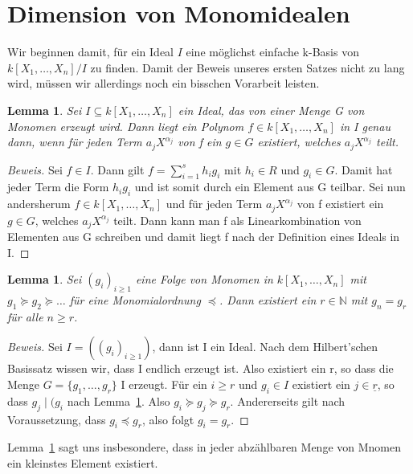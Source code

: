 \documentclass{article}
\newtheorem{lemma}[satz]{Lemma}
\newcommand*{\R}{k[X_{1},\ldots,X_{n}]}
\begin{document}
\section{Dimension von Monomidealen}
	
	Wir beginnen damit, für ein Ideal \(I\) eine möglichst einfache k-Basis von \(\R/I\) zu finden.
	Damit der Beweis unseres ersten Satzes nicht zu lang wird, müssen wir allerdings noch ein
	bisschen Vorarbeit leisten.

	\begin{lemma} \label{1.2.3}
	Sei \(I \subseteq \R\) ein Ideal, das von einer Menge G von Monomen erzeugt wird. Dann liegt
	ein Polynom \(f \in \R\) in I genau dann, wenn für jeden Term \(a_{j}X^{\alpha_{j}}\) von f ein
	\(g \in G\) existiert, welches \(a_{j}X^{\alpha_{j}}\) teilt.
	\end{lemma}

	\begin{proof}[Beweis]
	Sei \(f \in I\). Dann gilt \(f = \sum_{i=1}^{s} h_{i}g_{i}\) mit \(h_{i} \in R\) und \(g_{i}
	\in G\). Damit hat jeder Term die Form \(h_{i}g_{i}\) und ist somit durch ein Element aus G
	teilbar.
	Sei nun andersherum \(f \in \R\) und für jeden Term \(a_{j}X^{\alpha_{j}}\) von f existiert ein
	\(g \in G\), welches \(a_{j}X^{\alpha_{j}}\) teilt. Dann kann man f als Linearkombination von 
	Elementen aus G schreiben und damit liegt f nach der Definition eines Ideals in I.
	\end{proof}


	\begin{lemma} \label{1.2.4}
	Sei \((g_{i})_{i \geq 1}\) eine Folge von Monomen in \(\R\) mit \(g_{1} \succeq g_{2} \succeq
	\ldots\) für eine Monomialordnung \(\preceq\). Dann existiert ein \(r \in \mathbb{N}\) mit 
	\(g_{n} = g_{r}\) für alle \(n \geq r\). 
	\end{lemma}

	\begin{proof}[Beweis]
	Sei \(I = ((g_{i})_{i \geq 1})\), dann ist I ein Ideal. Nach dem Hilbert'schen Basissatz
	wissen wir, dass I endlich erzeugt ist. Also existiert ein r, so dass die Menge \(G = \{g_{1},
	\ldots, g_{r}\}\) I erzeugt. Für ein \(i \geq r\) und \(g_{i} \in I\) existiert ein
	\(j \in \underline{r}\), so dass \(g_{j}\; | \;(g_{i}\) nach Lemma~\ref{1.2.3}. Also \(g_{i}
	\succeq g_{j} \succeq g_{r}\). Andererseits gilt nach Voraussetzung, dass \(g_{i} \preceq g_{r}
	\), also folgt \(g_{i} = g_{r}\).
	\end{proof}

	Lemma~\ref{1.2.4} sagt uns insbesondere, dass in jeder abzählbaren Menge von Mnomen ein
	kleinstes Element existiert.
	
\end{document}
